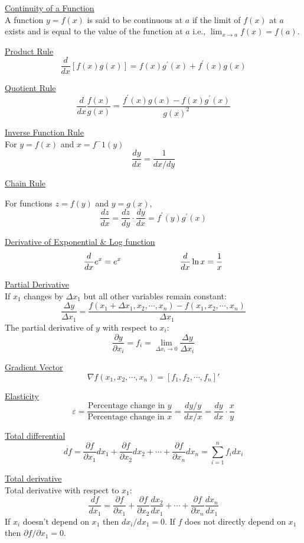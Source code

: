 \documentclass{./../../Latex/tests}
\begin{document}
\underline{Continuity of a Function} \\
A function $y=f(x)$ is said to be continuous at $a$ if the limit of $f(x)$ at $a$ exists and is equal to the value of the function at $a$ i.e.,
$\lim _{x \rightarrow a} f(x) = f(a)$.

\underline{Product Rule} \vspace{-0.75em}
$$
\frac{d}{d x}[f(x) g(x)]=f(x) g^{\prime}(x)+f^{\prime}(x) g(x)
$$ \vspace{0.2em}

\underline{Quotient Rule} \vspace{-0.75em}
$$ \frac{d}{d x} \frac{f(x)}{g(x)}=\frac{f^{\prime}(x) g(x)-f(x) g^{\prime}(x)}{g(x)^2} $$ \vspace{0.2em}

\underline{Inverse Function Rule}\\ 
For $y=f(x)$ and $x=f^-1(y)$ \vspace{-0.75em}
$$ \frac{dy}{dx} = \frac{1}{dx/dy}  $$

\underline{Chain Rule} 

For functions $ z=f(y)$ and $y=g(x) $,
$$\frac{d z}{d x}=\frac{d z}{d y} \cdot \frac{d y}{d x}=f^{\prime}(y) g^{\prime}(x) $$

 \underline{Derivative of  Exponential \& Log function} \vspace{-0.75em}
 $$ \frac{d}{dx}e^{x} =e^x \hspace{2.5cm} \frac{d}{d x} \ln x =\frac{1}{x} $$ 
 

\newpage
\underline{Partial Derivative} \\
If $x_1$ changes by $\Delta x_1$ but all other variables remain constant: 
$$
\frac{\Delta y}{\Delta x_{1}}=\frac{f\left(x_{1}+\Delta x_1, x_{2}, \cdots, x_{n}\right)-f\left(x_{1}, x_{2}, \cdots, x_{n}\right)}{\Delta x_{1}}
$$
The partial derivative of $y$ with respect to $x_i$:
$$
\frac{\partial y}{\partial x_{i}}= f_i = \lim _{\Delta x_{i} \rightarrow 0} \frac{\Delta y}{\Delta x_{i}}
$$


\underline{Gradient Vector}
$$ \nabla f(x_1, x_2, \cdots, x_n) = [f_1, f_2, \cdots, f_n]' $$


\underline{Elasticity} \vspace{-0.75em}
\[ \varepsilon = \frac{\text{Percentage change in $y$}}{\text{Percentage change in $x$}} = \frac{dy/y}{dx/x} = \frac{dy}{dx} \cdot \frac{x}{y} \] \vspace{-0.25em}


\underline{Total differential} \vspace{-0.75em}
\[
d f=\frac{\partial f}{\partial x_{1}} d x_{1}+\frac{\partial f}{\partial x_{2}} d x_{2}+\cdots+\frac{\partial f}{\partial x_{n}} d x_{n}=\sum_{i=1}^{n} f_{i} d x_{i}
\] \vspace{-0.75em}


\underline{Total derivative} \\
Total derivative with respect to $x_1$: 
\[
\frac{d f}{d x_1}=\frac{\partial f}{\partial x_{1}} +\frac{\partial f}{\partial x_{2}}\frac{d x_{2}}{d x_1}+\cdots+\frac{\partial f}{\partial x_{n}} \frac{d x_{n}}{d x_1}
\]
If $x_i$ doesn't depend on $x_1$ then $d x_i/d x_1=0$. If $f$ does not directly depend on $x_1$ then $\partial f/\partial x_{1}=0$. 
\end{document}
